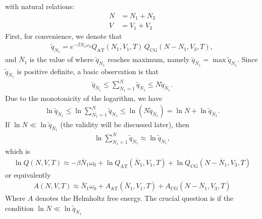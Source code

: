 \documentclass[aip,jcp,a4paper,reprint,onecolumn]{revtex4-1}
\newcommand{\AT}{{\textrm{{AT}}}}
\newcommand{\CG}{{\textrm{CG}}}
\begin{document}
with natural relations:
\begin{align}
  N &= N_1 + N_3\\
  V &= V_1 + V_3
\end{align}
First, for convenience, we denote that
\begin{align}
  \tilde q_{N_1} = 
  e^{-\beta N_1\omega_0}
  Q_{\AT}(N_1, V_1, T)\,
  Q_{\CG}(N - N_1, V_3, T),
\end{align}
and $\bar N_1$ is the value of where $\tilde q_{N_1}$ reaches
maximum, namely $\tilde q_{\bar N_1} = \max \tilde q_{N_1}$.
Since $\tilde q_{N_1}$ is positive definite, a basic
observation is that
\begin{align}
  \tilde q_{\bar N_1}
  \leq
  \sum_{N_1=1}^N \tilde q_{N_1}
  \leq
  N \tilde q_{\bar N_1}. 
\end{align}
Due to the monotonicity of the logarithm, we have
\begin{align}
  \ln\tilde q_{\bar N_1}
  \leq
  \ln\sum_{N_1=1}^N \tilde q_{N_1}
  \leq
  \ln (N \tilde q_{\bar N_1})
  =
  \ln N + \ln\tilde q_{\bar N_1}.
\end{align}
If $\ln N \ll \ln \tilde q_{\bar N_1}$ (the validity will be discussed
later), then 
\begin{align}
  \ln\sum_{N_1=1}^N \tilde q_{N_1}
  \approx
  \ln\tilde q_{\bar N_1},
\end{align}
which is
\begin{align}
  \ln Q(N, V, T)
  \approx
  -\beta \bar N_1\omega_0 + 
  \ln Q_{\AT}(\bar N_1, V_1, T) + \ln Q_{\CG}(N - \bar N_1, V_3, T)
\end{align}
or equivalently
\begin{align}\label{eqn:a-energy-1}
  A(N, V, T)
  \approx
  \bar N_1\omega_0 +
  A_{\AT}(\bar N_1, V_1, T) + A_{\CG}(N - \bar N_1, V_3, T)
\end{align}
Where $A$ denotes the Helmholtz free energy. 
The crucial question is if the condition $\ln N \ll \ln \tilde q_{\bar N_1}$
\end{document}

